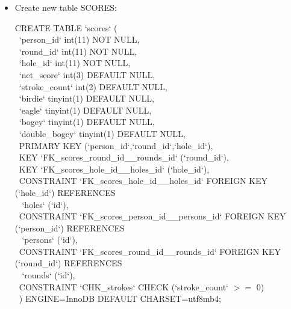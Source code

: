 \documentclass[titlepage]{article}
\begin{document}
\begin{itemize}
\vspace{1em}

\item Create new table SCORES: \vspace{1em}

\hspace{15pt}CREATE TABLE `scores` ( \\
\-\ \hspace{30pt}`person\_id` int(11) NOT NULL, \\
\-\ \hspace{30pt}`round\_id` int(11) NOT NULL, \\
\-\ \hspace{30pt}`hole\_id` int(11) NOT NULL, \\
\-\ \hspace{30pt}`net\_score` int(3) DEFAULT NULL, \\
\-\ \hspace{30pt}`stroke\_count` int(2) DEFAULT NULL, \\
\-\ \hspace{30pt}`birdie` tinyint(1) DEFAULT NULL, \\
\-\ \hspace{30pt}`eagle` tinyint(1) DEFAULT NULL, \\
\-\ \hspace{30pt}`bogey` tinyint(1) DEFAULT NULL, \\
\-\ \hspace{30pt}`double\_bogey` tinyint(1) DEFAULT NULL, \\
\-\ \hspace{30pt}PRIMARY KEY (`person\_id`,`round\_id`,`hole\_id`), \\
\-\ \hspace{30pt}KEY `FK\_scores\_round\_id\_\_rounds\_id` (`round\_id`), \\
\-\ \hspace{30pt}KEY `FK\_scores\_hole\_id\_\_holes\_id` (`hole\_id`), \\
\-\ \hspace{30pt}CONSTRAINT `FK\_scores\_hole\_id\_\_holes\_id` FOREIGN KEY (`hole\_id`) REFERENCES \\ \-\ \hspace{30pt} `holes` (`id`), \\
\-\ \hspace{30pt}CONSTRAINT `FK\_scores\_person\_id\_\_persons\_id` FOREIGN KEY (`person\_id`) REFERENCES \\ \-\ \hspace{30pt} `persons` (`id`), \\
\-\ \hspace{30pt}CONSTRAINT `FK\_scores\_round\_id\_\_rounds\_id` FOREIGN KEY (`round\_id`) REFERENCES \\ \-\ \hspace{30pt} `rounds` (`id`), \\
\-\ \hspace{30pt}CONSTRAINT `CHK\_strokes` CHECK (`stroke\_count` $>=$ 0) \\
\-\ \hspace{15pt}) ENGINE=InnoDB DEFAULT CHARSET=utf8mb4; 


\end{itemize}
\end{document}
